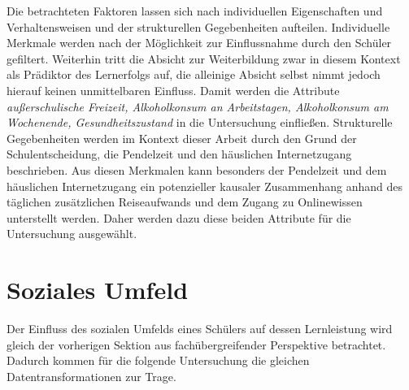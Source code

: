 Die betrachteten Faktoren lassen sich nach individuellen Eigenschaften und Verhaltensweisen und der strukturellen Gegebenheiten aufteilen.
Individuelle Merkmale werden nach der Möglichkeit zur Einflussnahme durch den Schüler gefiltert.
Weiterhin tritt die Absicht zur Weiterbildung zwar in diesem Kontext als Prädiktor des Lernerfolgs auf, die alleinige Absicht selbst nimmt jedoch hierauf keinen unmittelbaren Einfluss.
Damit werden die Attribute \textit{außerschulische Freizeit, Alkoholkonsum an Arbeitstagen, Alkoholkonsum am Wochenende, Gesundheitszustand} in die Untersuchung einfließen.
Strukturelle Gegebenheiten werden im Kontext dieser Arbeit durch den Grund der Schulentscheidung, die Pendelzeit und den häuslichen Internetzugang beschrieben.
Aus diesen Merkmalen kann besonders der Pendelzeit und dem häuslichen Internetzugang ein potenzieller kausaler Zusammenhang anhand des täglichen zusätzlichen Reiseaufwands und dem Zugang zu Onlinewissen unterstellt werden.
Daher werden dazu diese beiden Attribute für die Untersuchung ausgewählt.

\section{Soziales Umfeld}


Der Einfluss des sozialen Umfelds eines Schülers auf dessen Lernleistung wird gleich der vorherigen Sektion aus fachübergreifender Perspektive betrachtet.
Dadurch kommen für die folgende Untersuchung die gleichen Datentransformationen zur Trage.

